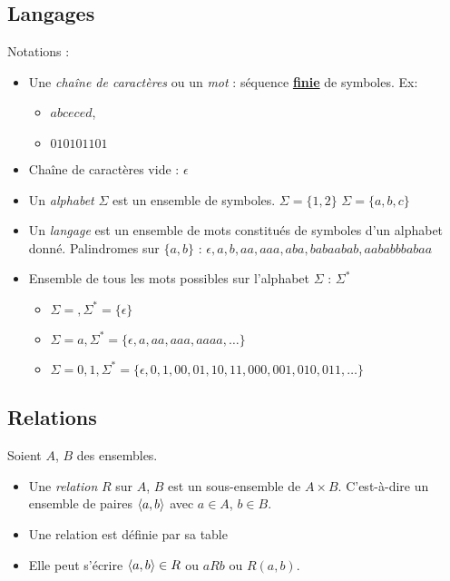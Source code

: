 \subsection{Langages}
\label{subsec:Langages}
Notations :
\begin{itemize}
    \item Une \emph{chaîne de caractères} ou un \emph{mot} : séquence \textbf{\underline{finie}} de symboles. Ex:
    	\begin{itemize}
    		\item $abceced$,
    		\item $010101101$
    	\end{itemize}
	\item Chaîne de caractères vide : $\epsilon$
    \item Un \emph{alphabet} $\Sigma$ est un ensemble de symboles. $\Sigma = \{1, 2\}$ $\Sigma = \{a, b, c\}$
    \item Un \emph{langage} est un ensemble de mots constitués de symboles d'un alphabet donné.
    	\subitem Palindromes sur $\{a, b\}$ : $\epsilon, a, b, aa, aaa, aba, babaabab, aababbbabaa$
	\item Ensemble de tous les mots possibles sur l'alphabet $\Sigma$ : $\Sigma ^*$
		\begin{itemize}
			\item $\Sigma = {}, \Sigma^* = \{\epsilon\}$
			\item $\Sigma = {a}, \Sigma^* = \{\epsilon, a,aa,aaa,aaaa, \ldots\}$
			\item $\Sigma = {0,1}, \Sigma^* = \{\epsilon, 0,1,00,01,10,11,000,001,010,011, \ldots\}$
		\end{itemize}
\end{itemize}


\subsection{Relations}
\label{subsec:relations}
Soient $A$, $B$ des ensembles.
\begin{itemize}
	\item Une \emph{relation} $R$ sur $A$, $B$ est un sous-ensemble de $A \times B$. C'est-à-dire
		un ensemble de paires $\langle a,b \rangle$ avec $a\in A$, $b\in B$.
	\item Une relation est définie par sa table
	\item Elle peut s'écrire $\langle a,b \rangle \in R$ ou $aR b$ ou $R(a,b)$.
\end{itemize}

